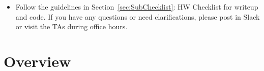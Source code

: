 \documentclass[11pt]{article}
\numberwithin{equation}{section} %
\numberwithin{figure}{section} %
\numberwithin{table}{section} %
\begin{document}
\begin{itemize}
(1) Once you write a function, uncomment the corresponding lines in \texttt{main.py} to verify whether the function executes correctly. 

(2) To debug your logic within a function, use \texttt{print()} or \texttt{breakpoint()}.

\item Follow the guidelines in Section~\ref{sec:SubChecklist}: HW Checklist for writeup and code. If you have any questions or need clarifications, please post in Slack or visit the TAs during office hours. 

\end{itemize}

\clearpage

\section*{Overview}\label{sec:overview}
\end{document}
